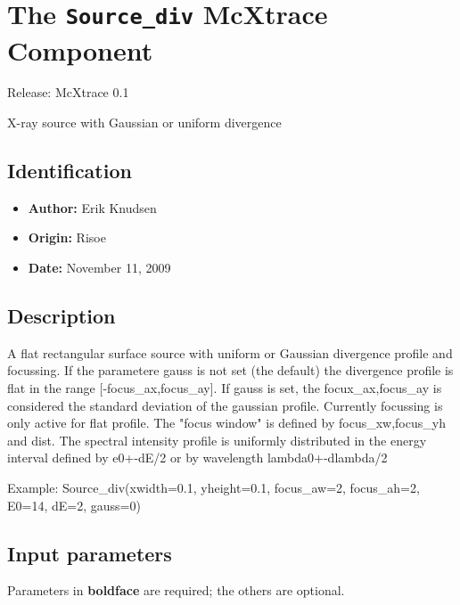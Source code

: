 \section{The \texttt{Source\_div} McXtrace Component}
Release: McXtrace 0.1

X-ray source with Gaussian or uniform divergence

\subsection*{Identification}
\begin{itemize}
  \item \textbf{Author:} Erik Knudsen
  \item \textbf{Origin:} Risoe
  \item \textbf{Date:} November 11, 2009
\end{itemize}

\subsection*{Description}
A flat rectangular surface source with uniform or Gaussian divergence profile and focussing. If the parametere gauss is not set (the default) the divergence profile is flat in the range [-focus\_ax,focus\_ay]. If gauss is set, the focux\_ax,focus\_ay is considered the standard deviation of the gaussian profile. Currently focussing is only active for flat profile. The "focus window" is defined by focus\_xw,focus\_yh and dist. The spectral intensity profile is uniformly distributed in the energy interval defined by e0+-dE/2 or by wavelength lambda0+-dlambda/2

Example: Source\_div(xwidth=0.1, yheight=0.1, focus\_aw=2, focus\_ah=2, E0=14, dE=2, gauss=0)

\subsection*{Input parameters}
Parameters in \textbf{boldface} are required; the others are optional.


